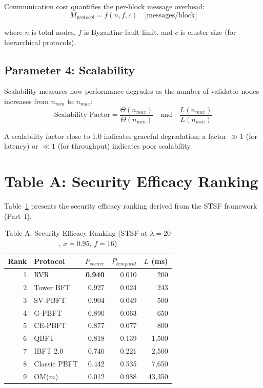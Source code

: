\documentclass[10pt,twocolumn,letterpaper]{article}
\begin{document}
Communication cost quantifies the per-block message overhead:
\begin{equation}
M_{protocol} = f(n, f, c) \quad \text{[messages/block]}
\end{equation}

where $n$ is total nodes, $f$ is Byzantine fault limit, and $c$ is cluster size (for hierarchical protocols).

\subsection{Parameter 4: Scalability}

Scalability measures how performance degrades as the number of validator nodes increases from $n_{min}$ to $n_{max}$:
\begin{equation}
\text{Scalability Factor} = \frac{\Theta(n_{max})}{\Theta(n_{min})} \quad \text{and} \quad \frac{L(n_{max})}{L(n_{min})}
\end{equation}

A scalability factor close to 1.0 indicates graceful degradation; a factor $\gg 1$ (for latency) or $\ll 1$ (for throughput) indicates poor scalability.

\section{Table A: Security Efficacy Ranking}
\label{sec:table_a}

Table~\ref{tab:security_ranking} presents the security efficacy ranking derived from the STSF framework (Part~I).

\begin{table}[htbp]
\caption{Table A: Security Efficacy Ranking (STSF at $\lambda=20$, $x=0.95$, $f=16$)}
\label{tab:security_ranking}
\centering
\scriptsize
\begin{tabular}{@{}rlrrr@{}}
\toprule
\textbf{Rank} & \textbf{Protocol} & \textbf{$P_{secure}$} & \textbf{$P_{temporal}$} & \textbf{$L$ (ms)} \\
\midrule
1 & RVR & \textbf{0.940} & 0.010 & 200 \\
2 & Tower BFT & 0.927 & 0.024 & 243 \\
3 & SV-PBFT & 0.904 & 0.049 & 500 \\
4 & G-PBFT & 0.890 & 0.063 & 650 \\
5 & CE-PBFT & 0.877 & 0.077 & 800 \\
6 & QBFT & 0.818 & 0.139 & 1,500 \\
7 & IBFT 2.0 & 0.740 & 0.221 & 2,500 \\
8 & Classic PBFT & 0.442 & 0.535 & 7,650 \\
9 & OM($m$) & 0.012 & 0.988 & 43,350 \\
\bottomrule
\end{tabular}
\end{table}
\end{document}
